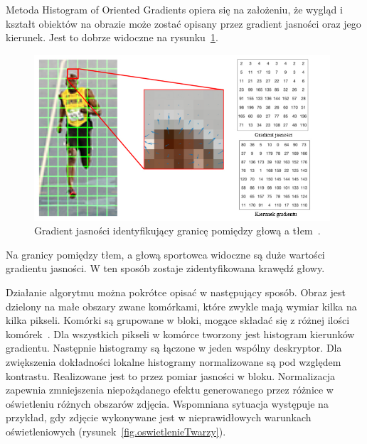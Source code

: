 \documentclass[a4paper,twoside,12pt]{book}
\begin{document}
    Metoda Histogram of Oriented Gradients opiera się na założeniu, że wygląd i kształt obiektów na obrazie może zostać
    opisany przez gradient jasności oraz jego kierunek. Jest to dobrze widoczne na
    rysunku~\ref{fig.gradientJasnosciNaGlowie}.
    \begin{figure}[b]
        \centering
        \includegraphics[width=11cm]{Obrazy/gradientJasnosciNaGlowie.jpg}
        \caption{Gradient jasności identyfikujący granicę pomiędzy głową a tłem~\cite{hogOpenCv}.}
        \label{fig.gradientJasnosciNaGlowie}
    \end{figure}
    Na granicy pomiędzy tłem, a głową sportowca widoczne są duże wartości gradientu jasności.
    W ten sposób zostaje zidentyfikowana krawędź głowy.

    Działanie algorytmu można pokrótce opisać w następujący sposób. Obraz jest dzielony na małe obszary zwane komórkami,
    które zwykle mają wymiar kilka na kilka pikseli. Komórki są grupowane w bloki, mogące składać się z różnej ilości
    komórek~\cite{hogOpis}.
    Dla wszystkich pikseli w komórce tworzony jest histogram kierunków gradientu.
    Następnie histogramy są łączone w jeden wspólny deskryptor.
    Dla zwiększenia dokładności lokalne histogramy normalizowane są pod względem kontrastu.
    Realizowane jest to przez pomiar jasności w bloku. Normalizacja zapewnia zmniejszenia niepożądanego efektu
    generowanego przez
    różnice w oświetleniu różnych obszarów zdjęcia. Wspomniana sytuacja występuje na przykład, gdy zdjęcie wykonywane
    jest w nieprawidłowych warunkach oświetleniowych (rysunek~\ref{fig.oswietlenieTwarzy}).
\end{document}
